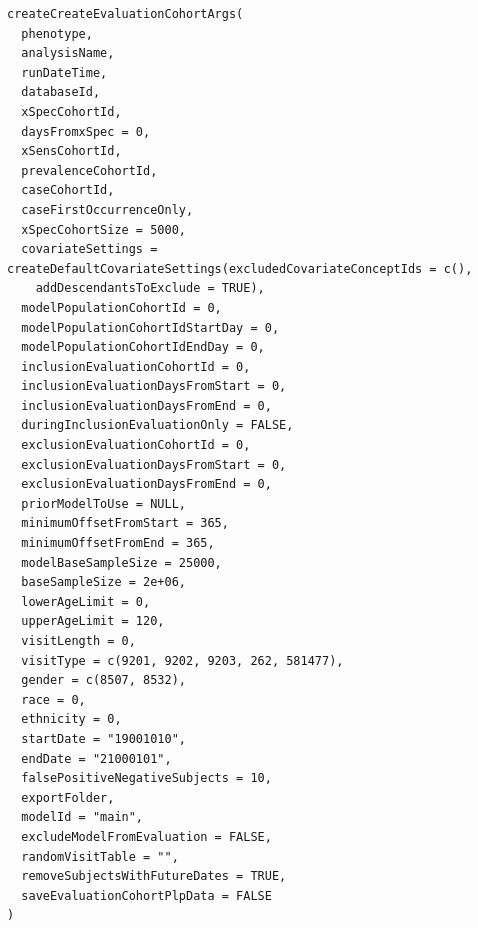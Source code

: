 \documentclass[a4paper]{book}
\begin{document}
\begin{Usage}
\begin{verbatim}
createCreateEvaluationCohortArgs(
  phenotype,
  analysisName,
  runDateTime,
  databaseId,
  xSpecCohortId,
  daysFromxSpec = 0,
  xSensCohortId,
  prevalenceCohortId,
  caseCohortId,
  caseFirstOccurrenceOnly,
  xSpecCohortSize = 5000,
  covariateSettings = createDefaultCovariateSettings(excludedCovariateConceptIds = c(),
    addDescendantsToExclude = TRUE),
  modelPopulationCohortId = 0,
  modelPopulationCohortIdStartDay = 0,
  modelPopulationCohortIdEndDay = 0,
  inclusionEvaluationCohortId = 0,
  inclusionEvaluationDaysFromStart = 0,
  inclusionEvaluationDaysFromEnd = 0,
  duringInclusionEvaluationOnly = FALSE,
  exclusionEvaluationCohortId = 0,
  exclusionEvaluationDaysFromStart = 0,
  exclusionEvaluationDaysFromEnd = 0,
  priorModelToUse = NULL,
  minimumOffsetFromStart = 365,
  minimumOffsetFromEnd = 365,
  modelBaseSampleSize = 25000,
  baseSampleSize = 2e+06,
  lowerAgeLimit = 0,
  upperAgeLimit = 120,
  visitLength = 0,
  visitType = c(9201, 9202, 9203, 262, 581477),
  gender = c(8507, 8532),
  race = 0,
  ethnicity = 0,
  startDate = "19001010",
  endDate = "21000101",
  falsePositiveNegativeSubjects = 10,
  exportFolder,
  modelId = "main",
  excludeModelFromEvaluation = FALSE,
  randomVisitTable = "",
  removeSubjectsWithFutureDates = TRUE,
  saveEvaluationCohortPlpData = FALSE
)
\end{verbatim}
\end{Usage}
%
\end{document}
